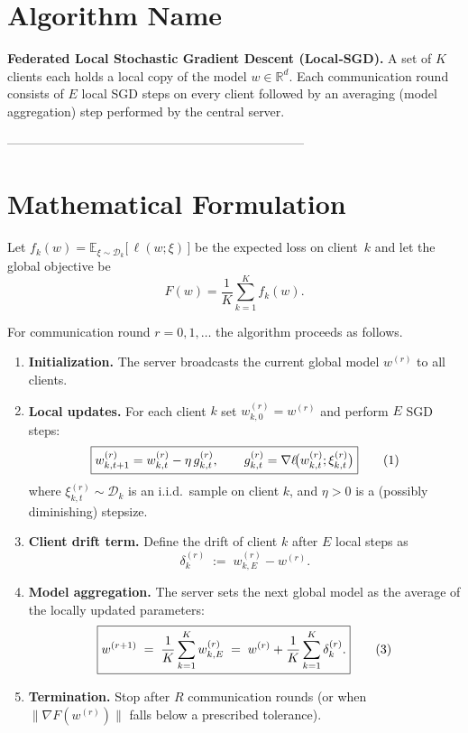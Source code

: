 \documentclass{article}
\newcommand{\R}{\mathbb{R}}
\begin{document}
\section*{Algorithm Name}
\textbf{Federated Local Stochastic Gradient Descent (Local‑SGD).}  
A set of $K$ clients each holds a local copy of the model $w\in\R^{d}$.  
Each communication round consists of $E$ local SGD steps on every client
followed by an averaging (model aggregation) step performed by the central server.

-----------------------------------------------------------------------

\section*{Mathematical Formulation}
Let $f_k(w)=\mathbb{E}_{\xi\sim\mathcal{D}_k}\big[\,\ell(w;\xi)\,\big]$ be the
expected loss on client~$k$ and let the global objective be
\[
F(w)=\frac1K\sum_{k=1}^{K} f_k(w).
\]

For communication round $r=0,1,\dots$ the algorithm proceeds as follows.

\begin{enumerate}[label=\arabic*.]
\item \textbf{Initialization.} The server broadcasts the current global model
$w^{(r)}$ to all clients.

\item \textbf{Local updates.}  
For each client $k$ set $w_{k,0}^{(r)} = w^{(r)}$ and perform $E$ SGD steps:
\[
\boxed{%
w_{k,t+1}^{(r)} = w_{k,t}^{(r)} - \eta \, g_{k,t}^{(r)},
\qquad
g_{k,t}^{(r)} = \nabla\ell\!\big(w_{k,t}^{(r)};\xi_{k,t}^{(r)}\big)
}
\tag{1}
\]
where $\xi_{k,t}^{(r)}\sim\mathcal{D}_k$ is an i.i.d.\ sample on client $k$,
and $\eta>0$ is a (possibly diminishing) stepsize.

\item \textbf{Client drift term.}  
Define the drift of client $k$ after $E$ local steps as
\[
\delta_k^{(r)} \;:=\; w_{k,E}^{(r)} - w^{(r)}.
\tag{2}
\]

\item \textbf{Model aggregation.}  
The server sets the next global model as the average of the locally
updated parameters:
\[
\boxed{%
w^{(r+1)} \;=\; \frac1K\sum_{k=1}^{K} w_{k,E}^{(r)} 
          \;=\; w^{(r)} + \frac1K\sum_{k=1}^{K}\delta_k^{(r)} .
}
\tag{3}
\]

\item \textbf{Termination.}  
Stop after $R$ communication rounds (or when $\| \nabla F(w^{(r)})\|$ falls
below a prescribed tolerance).
\end{enumerate}
\end{document}

